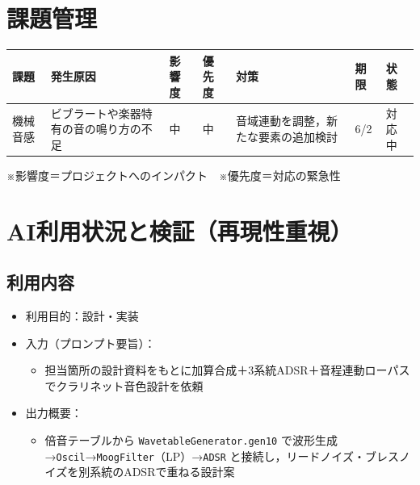 \documentclass[uplatex,dvipdfmx]{jlreq}
\begin{document}
\section{課題管理}
\begin{table}[H]
  \centering
  \begin{tabular}{p{2.2cm}p{2.2cm}p{1.3cm}p{1.3cm}p{2.2cm}p{1cm}p{1.3cm}}
\hline
課題 & 発生原因 & 影響度 & 優先度 & 対策 & 期限 & 状態 \\ \hline \hline
機械音感 & ビブラートや楽器特有の音の鳴り方の不足 & 中 & 中 & 音域連動を調整，新たな要素の追加検討 & 6/2 & 対応中 \\ \hline
  \end{tabular}
\end{table}
※影響度＝プロジェクトへのインパクト　※優先度＝対応の緊急性

\section{AI利用状況と検証（再現性重視）}
\subsection{利用内容}
\begin{itemize}
  \item 利用目的：設計・実装
  \item 入力（プロンプト要旨）：
  \begin{itemize}
    \item 担当箇所の設計資料をもとに加算合成＋3系統ADSR＋音程連動ローパスでクラリネット音色設計を依頼
  \end{itemize}
  \item 出力概要：
  \begin{itemize}
    \item 倍音テーブルから \texttt{WavetableGenerator.gen10} で波形生成→\texttt{Oscil}→\texttt{MoogFilter}（LP）→\texttt{ADSR} と接続し，リードノイズ・ブレスノイズを別系統のADSRで重ねる設計案
  \end{itemize}
\end{itemize}
\end{document}
